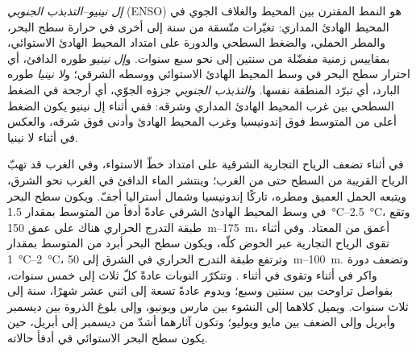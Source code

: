 \begin{definition}\label{def:b2:climate-variability:enso}
\emph{إل نينيو--التذبذب الجنوبي} (ENSO) هو
النمط المقترن بين المحيط والغلاف الجوي في المحيط الهادئ المداري: تغيّرات متّسقة من سنة إلى أخرى في
حرارة سطح البحر، والمطر الحملي، والضغط السطحي والدورة على امتداد
المحيط الهادئ الاستوائي، بمقاييس زمنية مفضّلة من سنتين إلى نحو سبع سنوات. و\emph{إل
نينيو} طوره الدافئ، أي احترار سطح البحر في وسط المحيط الهادئ الاستوائي
ووسطه الشرقي؛ و\emph{لا نينيا} طوره البارد، أي تبرّد
المنطقة نفسها. و\emph{التذبذب الجنوبي} جزؤه الجوّي،
أي أرجحة في الضغط السطحي بين غرب المحيط الهادئ المداري وشرقه: ففي أثناء إل نينيو
يكون الضغط أعلى من المتوسط فوق إندونيسيا وغرب المحيط الهادئ وأدنى فوق
شرقه، والعكس في أثناء لا نينيا.
\end{definition}

في أثناء  تضعف الرياح التجارية الشرقية على امتداد خطّ الاستواء، وفي الغرب قد
تهبّ الرياح القريبة من السطح حتى من الغرب؛ وينتشر الماء الدافئ في الغرب نحو الشرق، ويتبعه الحمل
العميق ومطره، تاركًا إندونيسيا وشمال أستراليا أجفّ. ويكون سطح البحر
في وسط المحيط الهادئ الشرقي عادةً أدفأ من المتوسط بمقدار \qtyrange{1.5}{2.5}{\celsius}، وتقع
طبقة التدرج الحراري هناك على عمق \qtyrange{150}{175}{m}، أعمق من المعتاد. وفي أثناء  تقوى الرياح
التجارية عبر الحوض كلّه، ويكون سطح البحر أبرد من المتوسط بمقدار \qtyrange{1}{2}{\celsius}،
وترتفع طبقة التدرج الحراري في الشرق إلى \qtyrange{50}{100}{m}. وتضعف دورة واكر
في أثناء  وتقوى في أثناء . وتتكرّر النوبات عادةً كلّ ثلاث إلى
خمس سنوات، بفواصل تراوحت بين سنتين وسبع؛ ويدوم  عادةً تسعة إلى
اثني عشر شهرًا،  سنة إلى ثلاث سنوات. ويميل كلاهما إلى النشوء بين مارس ويونيو،
وإلى بلوغ الذروة بين ديسمبر وأبريل وإلى الضعف بين مايو ويوليو؛ وتكون آثارهما أشدّ
من ديسمبر إلى أبريل، حين يكون سطح البحر الاستوائي في أدفأ حالاته.

